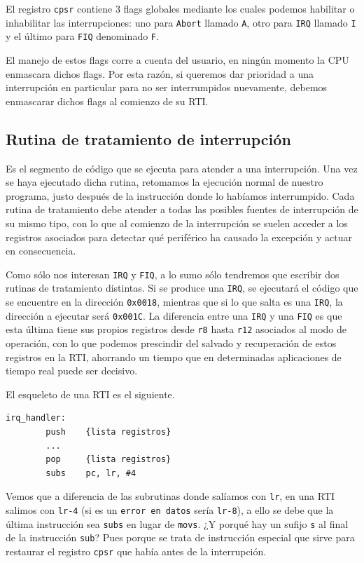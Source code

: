 El registro {\tt cpsr} contiene 3 flags globales mediante los cuales podemos habilitar o
inhabilitar las interrupciones: uno para {\tt Abort} llamado {\tt A}, otro para
{\tt IRQ} llamado {\tt I} y el último para {\tt FIQ} denominado {\tt F}.

El manejo de estos flags corre a cuenta del usuario, en ningún momento la CPU enmascara
dichos flags. Por esta razón, si queremos dar prioridad a una interrupción en particular
para no ser interrumpidos nuevamente, debemos enmascarar dichos flags al comienzo de su RTI.

\subsection{Rutina de tratamiento de interrupción}

Es el segmento de código que se ejecuta para atender a una interrupción. Una vez se haya
ejecutado dicha rutina, retomamos la ejecución normal de nuestro programa, justo después de la instrucción
donde lo habíamos interrumpido. Cada rutina de tratamiento debe atender a todas las posibles
fuentes de interrupción de su mismo tipo, con lo que al comienzo de la interrupción se suelen
acceder a los registros asociados para detectar qué periférico ha causado la excepción y
actuar en consecuencia.

Como sólo nos interesan {\tt IRQ} y {\tt FIQ}, a lo sumo sólo tendremos que escribir dos
rutinas de tratamiento distintas. Si se produce una {\tt IRQ}, se ejecutará el código
que se encuentre en la dirección {\tt 0x0018}, mientras que si lo que salta es una {\tt IRQ},
la dirección a ejecutar será {\tt 0x001C}. La diferencia entre una {\tt IRQ} y una
{\tt FIQ} es que esta última tiene sus propios registros desde {\tt r8} hasta {\tt r12}
asociados al modo de operación, con lo que podemos prescindir del salvado y recuperación
de estos registros en la RTI, ahorrando un tiempo que en determinadas aplicaciones de
tiempo real puede ser decisivo.

El esqueleto de una RTI es el siguiente.

\begin{lstlisting}
irq_handler:
        push    {lista registros}
        ...
        pop     {lista registros}
        subs    pc, lr, #4
\end{lstlisting}

Vemos que a diferencia de las subrutinas donde salíamos con {\tt lr}, en una RTI salimos
con {\tt lr-4} (si es un {\tt error en datos} sería {\tt lr-8}), a ello se debe que la última
instrucción sea {\tt subs} en lugar de {\tt movs}.
¿Y porqué hay un sufijo {\tt s} al final
de la instrucción {\tt sub}? Pues porque se trata de instrucción especial que sirve para
restaurar el registro {\tt cpsr} que había antes de la interrupción.

